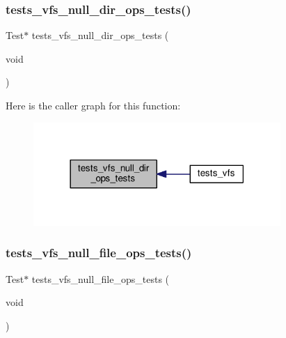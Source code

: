 \subsubsection{\texorpdfstring{tests\+\_\+vfs\+\_\+null\+\_\+dir\+\_\+ops\+\_\+tests()}{tests\_vfs\_null\_dir\_ops\_tests()}}
{\footnotesize\ttfamily Test$\ast$ tests\+\_\+vfs\+\_\+null\+\_\+dir\+\_\+ops\+\_\+tests (\begin{DoxyParamCaption}\item[{void}]{ }\end{DoxyParamCaption})}

Here is the caller graph for this function\+:
\nopagebreak
\begin{figure}[H]
\begin{center}
\leavevmode
\includegraphics[width=266pt]{tests-vfs_8c_a5e6248f295aefb41b6a0888f647e8fd9_icgraph}
\end{center}
\end{figure}
\mbox{\label{tests-vfs_8c_aa3c93ba92be080dce73d6ef5688ffb8b}} 
\subsubsection{\texorpdfstring{tests\+\_\+vfs\+\_\+null\+\_\+file\+\_\+ops\+\_\+tests()}{tests\_vfs\_null\_file\_ops\_tests()}}
{\footnotesize\ttfamily Test$\ast$ tests\+\_\+vfs\+\_\+null\+\_\+file\+\_\+ops\+\_\+tests (\begin{DoxyParamCaption}\item[{void}]{ }\end{DoxyParamCaption})}

